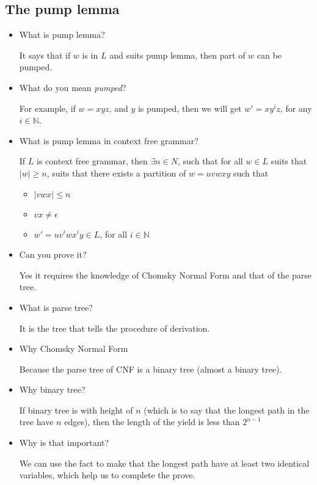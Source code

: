 \documentclass[../main.tex]{subfiles}
\begin{document}
\subsection{The pump lemma}
\begin{itemize}
\item What is pump lemma? 

It says that if \(w\) is in \(L\) and suits pump lemma, then 
part of \(w\) can be pumped.

\item What do you mean \emph{pumped}? 

For example, if \(w = x y z \), and \(y\) is pumped, then 
we will get \(w' = x y ^{i} z\), for any \(i \in \mathbb{N}\).

\item What is pump lemma in context free grammar? 

If \(L\) is context free grammar, then \(\exists n \in N\), such
that for all \(w \in L\) suits that \(\vert w \vert \ge n\), 
suits that there exists a partition of \(w =  uv w xy\) such that
\begin{itemize}
\item \(\vert   vw x \vert \le n\) 
\item \(vx \ne\epsilon\)
\item \(w ' =  u v^{i} w x ^{i} y \in L\), for all \(i \in \mathbb{N}\)
\end{itemize}

\item Can you prove it? 

Yes it requires the knowledge of Chomsky Normal Form and 
that of the parse tree. 

\item What is parse tree? 

It is the tree that tells the procedure of derivation. 

\item Why Chomsky Normal Form 

	Because the parse tree of CNF is a binary tree (almost a binary tree).

\item Why binary tree? 

	If binary tree is with height of \(n\) (which is to say that the longest path in the tree have \(n\) edges), then
	the length of the yield is less than \(2 ^{n-1}\)
\item Why is that important? 

We can use the fact to make that the longest path
have at least two identical variables, which help us to
complete the prove.


\end{itemize}
\end{document}
